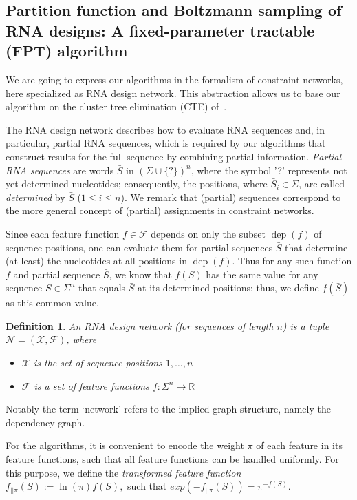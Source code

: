 \documentclass{bmcart}
\newtheorem{definition}[theorem]{Definition}
\newcommand{\network}{\mathcal{N}}
\newcommand{\val}{\bar S} %
\newcommand{\dep}{\operatorname{dep}}
\newcommand{\real}{\mathbb{R}}
\newcommand{\F}{\mathcal{F}}
\newcommand{\X}{\mathcal{X}}
\newcommand{\Def}[1]{\emph{#1}}
\newcommand{\evalfor}[2]{#1(#2)}
\newcommand{\citet}[1]{\cite{#1}}
\begin{document}
\subsection*{Partition function and Boltzmann sampling of RNA designs: A fixed-parameter tractable (FPT) algorithm}
\label{sec:FPT}

We are going to express our algorithms in the formalism of constraint networks, here
specialized as RNA design network. This abstraction allows us to base our
algorithm on the cluster tree elimination (CTE) of~\citet{Dechter2013}.

The RNA design network describes how to evaluate RNA sequences and, in
particular, partial RNA sequences, which is required by our algorithms
that construct results for the full sequence by combining partial
information.
%
\Def{Partial RNA sequences} are words $\val$ in
$(\Sigma\cup\{?\})^n$, where the symbol '?' represents not yet determined nucleotides; consequently, the positions, where $\val_i\in\Sigma$,
are called \Def{determined} by $\val$ ($1\leq i\leq n$).
%
We remark that (partial) sequences correspond to the more general concept of (partial) assignments in
constraint networks.

Since each feature function $f\in\F$
depends on only the subset $\dep(f)$ of sequence positions, one can
evaluate them for partial sequences $\val$ that determine (at least)
the nucleotides at all positions in $\dep(f)$. Thus for any such function $f$
and partial sequence $\val$, we know that $f(S)$ has the same value for any sequence $S\in \Sigma^n$ that equals $\val$ at its determined positions; thus, we define $\evalfor{f}{\val}$ as this common value.

\begin{definition}
An \Def{RNA design network} (for sequences of length $n$) is a tuple $\network=(\X,\F)$, where\vspace{-6pt}
\begin{itemize}
\item $\X$ is the set of sequence positions $1,\dots,n$
\item $\F$ is a set of \Def{feature functions} $f:\Sigma^n\to\real$
\end{itemize}
\end{definition}
%
Notably the term `network' refers to the implied graph structure, namely the dependency graph.

\newcommand{\weighttransform}[2]{{#1}_{||{#2}}}

For the algorithms, it is convenient to encode the weight $\pi$ of each feature in its feature functions, such that all feature functions can be handled uniformly. For this purpose, we define the \Def{transformed feature function} 
$\weighttransform{f}{\pi}(S) := \ln(\pi)f(S),$
such that $exp(-\weighttransform{f}{\pi}(S))=\pi^{-f(S)}.$ 
%
\end{document}
